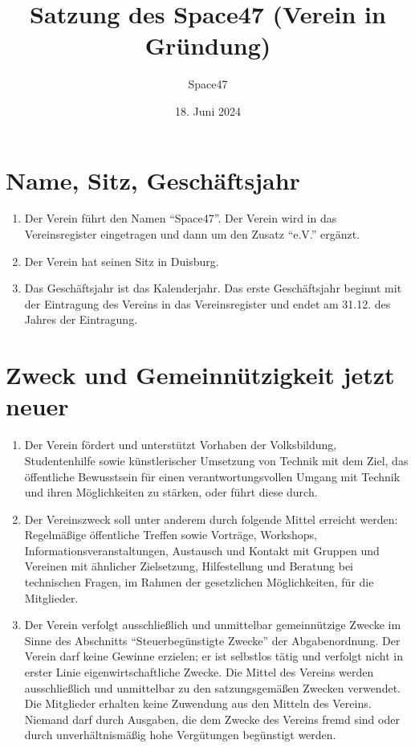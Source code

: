 \documentclass[a4paper]{article}
\title{Satzung des Space47 (Verein in Gründung)}
\author{Space47}
\date{18. Juni 2024}
\begin{document}
\maketitle

\section{Name, Sitz, Geschäftsjahr}
\begin{enumerate}
	\item Der Verein führt den Namen \enquote{Space47}. Der Verein wird in das Vereinsregister eingetragen und dann um den Zusatz \enquote{e.V.} ergänzt.
	\item Der Verein hat seinen Sitz in Duisburg.
	\item Das Geschäftsjahr ist das Kalenderjahr. Das erste Geschäftsjahr beginnt mit der Eintragung des Vereins in das Vereinsregister und endet am 31.12. des Jahres der Eintragung.
\end{enumerate}

\section{Zweck und Gemeinnützigkeit jetzt neuer}
\begin{enumerate}
	\item Der Verein fördert und unterstützt Vorhaben der Volksbildung, Studentenhilfe sowie künstlerischer Umsetzung von Technik mit dem Ziel, das öffentliche Bewusstsein für einen verantwortungsvollen Umgang mit Technik und ihren Möglichkeiten zu stärken, oder führt diese durch.
	\item Der Vereinszweck soll unter anderem durch folgende Mittel erreicht werden: Regelmäßige öffentliche Treffen sowie Vorträge, Workshops, Informationsveranstaltungen, Austausch und Kontakt mit Gruppen und Vereinen mit ähnlicher Zielsetzung, Hilfestellung und Beratung bei technischen Fragen, im Rahmen der gesetzlichen Möglichkeiten, für die Mitglieder.
	\item Der Verein verfolgt ausschließlich und unmittelbar gemeinnützige Zwecke im Sinne des Abschnitts \enquote{Steuerbegünstigte Zwecke} der Abgabenordnung. Der Verein darf keine Gewinne erzielen; er ist selbstlos tätig und verfolgt nicht in erster Linie eigenwirtschaftliche Zwecke. Die Mittel des Vereins werden ausschließlich und unmittelbar zu den satzungsgemäßen Zwecken verwendet. Die Mitglieder erhalten keine Zuwendung aus den Mitteln des Vereins. Niemand darf durch Ausgaben, die dem Zwecke des Vereins fremd sind oder durch unverhältnismäßig hohe Vergütungen begünstigt werden. 
\end{enumerate}
\end{document}
